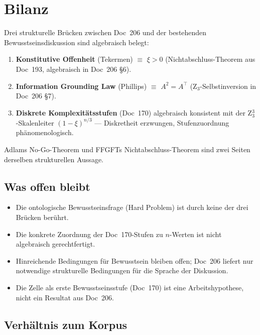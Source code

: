 \section{Bilanz}\label{sec:bilanz}

\begin{conclusionBox}
Drei strukturelle Brücken zwischen Doc~206 und der bestehenden Bewusstseinsdiskussion sind algebraisch belegt:

\begin{enumerate}
\item \textbf{Konstitutive Offenheit} (Tekermen) $\equiv$ $\xi > 0$ (Nichtabschluss-Theorem aus Doc~193, algebraisch in Doc~206 \S6).
\item \textbf{Information Grounding Law} (Phillips) $\equiv$ $A^2 = A^\top$ (Z$_3$-Selbstinversion in Doc~206 \S7).
\item \textbf{Diskrete Komplexitätsstufen} (Doc~170) algebraisch konsistent mit der Z$_3^3$-Skalenleiter $(1-\xi)^{n/3}$ — Diskretheit erzwungen, Stufenzuordnung phänomenologisch.
\end{enumerate}

Adlams No-Go-Theorem und FFGFTs Nichtabschluss-Theorem sind zwei Seiten derselben strukturellen Aussage.
\end{conclusionBox}

\subsection{Was offen bleibt}

\begin{itemize}
\item Die ontologische Bewusstseinsfrage (\glqq Hard Problem\grqq{}) ist durch keine der drei Brücken berührt.
\item Die konkrete Zuordnung der Doc~170-Stufen zu $n$-Werten ist nicht algebraisch gerechtfertigt.
\item Hinreichende Bedingungen für Bewusstsein bleiben offen; Doc~206 liefert nur notwendige strukturelle Bedingungen für die Sprache der Diskussion.
\item Die Zelle als \glqq erste Bewusstseinsstufe\grqq{} (Doc~170) ist eine Arbeitshypothese, nicht ein Resultat aus Doc~206.
\end{itemize}

\subsection{Verhältnis zum Korpus}

